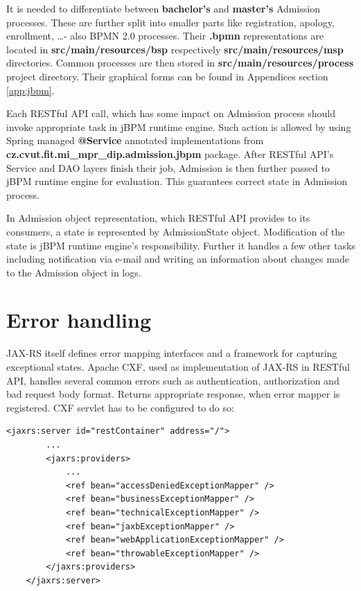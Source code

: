 	It is needed to differentiate between \textbf{bachelor's} and \textbf{master's} Admission processes. These are further
	split into smaller parts like registration, apology, enrollment, \ldots - also BPMN 2.0 processes. Their \textbf{.bpmn}
	representations are located in \textbf{src/main/resources/bsp} respectively \textbf{src/main/resources/msp}
	directories. Common processes are then stored in \textbf{src/main/resources/process} project directory. Their graphical
	forms can be found in Appendices section \ref{app:jbpm}.
	
	Each RESTful API call, which has some impact on Admission process should invoke appropriate task in jBPM runtime
	engine. Such action is allowed by using Spring managed \textbf{@Service} annotated implementations from
	\textbf{cz.cvut.fit.mi\_mpr\_dip.admission.jbpm} package. After RESTful API's Service and DAO layers finish their job,
	Admission is then further passed to jBPM runtime engine for evaluation. This guarantees correct state in Admission
	process.
	
	In Admission object representation, which RESTful API provides to its consumers, a state is represented by
	AdmissionState object. Modification of the state is jBPM runtime engine's responsibility. Further it handles a few
	other tasks including notification via e-mail and writing an information about changes made to the Admission object in
	logs.
	
	\section{Error handling}
	
	JAX-RS itself defines error mapping interfaces and a framework for capturing exceptional states. Apache CXF, used as
	implementation of JAX-RS in RESTful API, handles several common errors such as authentication, authorization and bad
	request body format. Returns appropriate response, when error mapper is registered. CXF servlet has to be configured to
	do so:
	
	\lstset{language=XML}
	\begin{lstlisting}[tabsize=2]
	<jaxrs:server id="restContainer" address="/">
		...
		<jaxrs:providers>
			...
			<ref bean="accessDeniedExceptionMapper" />
			<ref bean="businessExceptionMapper" />
			<ref bean="technicalExceptionMapper" />
			<ref bean="jaxbExceptionMapper" />
			<ref bean="webApplicationExceptionMapper" />
			<ref bean="throwableExceptionMapper" />
		</jaxrs:providers>
	</jaxrs:server>
	\end{lstlisting}
	
